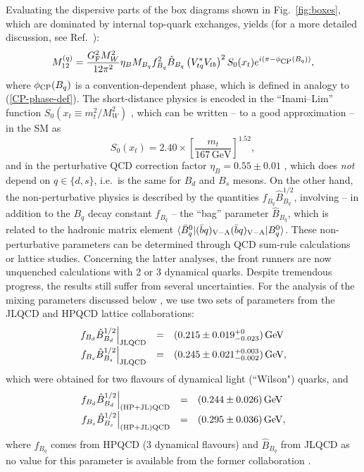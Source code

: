 \documentclass[11pt]{cernrep}
\begin{document}
Evaluating the dispersive parts of the box diagrams shown in
Fig.~\ref{fig:boxes}, which are dominated by internal top-quark 
exchanges, yields (for a more detailed discussion, see Ref.~\cite{BF-rev}):
\begin{equation}\label{M12-calc}
M_{12}^{(q)}=
\frac{G_{\rm F}^2 M_{W}^{2}}{12\pi^{2}}
\eta_B M_{B_q}f_{B_q}^{2}\hat B_{B_q}\left(V_{tq}^\ast V_{tb}\right)^2 
S_0(x_{t}) e^{i(\pi-\phi_{\mbox{{\scriptsize CP}}}(B_q))},
\end{equation}
where $\phi_{\mbox{{\scriptsize CP}}}(B_q)$ is a convention-dependent
phase, which is defined in analogy to (\ref{CP-phase-def}).
The short-distance physics is encoded in the ``Inami--Lim'' function 
$S_0(x_{t}\equiv m_t^2/M_W^2)$ \cite{IL}, which can be written -- to a good 
approximation -- in the SM  as \cite{Buras-Schladming}
\begin{equation}
S_0(x_t)=2.40\times\left[\frac{m_t}{167\,\mbox{GeV}}\right]^{1.52},
\end{equation}
and in the perturbative QCD correction factor  $\eta_B=0.55\pm0.01$ \cite{eta-B},
which does {\it not} depend on $q\in\{d,s\}$, i.e.\ is the same for $B_d$ and $B_s$ 
mesons. On the other hand, the non-perturbative physics is described by the 
quantities $f_{B_q}\hat B_{B_q}^{1/2}$, involving -- in addition to the $B_q$ decay 
constant $f_{B_q}$ -- the ``bag'' parameter $\hat B_{B_q}$, which is related to the hadronic matrix element $\langle \bar B^0_q|(\bar bq)_{{\rm V}-{\rm A}}
(\bar bq)_{{\rm V}-{\rm A}}|B^0_q\rangle$. These non-perturbative parameters
can be determined through QCD sum-rule calculations \cite{SR-calc}
or lattice studies. Concerning the latter analyses, the front runners are 
now unquenched calculations with 2 or 3 dynamical quarks. 
Despite tremendous progress, the results still suffer from several uncertainties. For the
analysis of the mixing parameters discussed below \cite{BF-DMs}, we use 
two sets of parameters from the JLQCD \cite{JLQCD} and 
HPQCD \cite{HPQCD} lattice collaborations:
\begin{equation}\label{JLQCD}
\begin{array}{rcl}
\left.f_{B_d}\hat{B}_{B_d}^{1/2}\right|_{\rm JLQCD} &=& (0.215\pm
0.019^{+0}_{-0.023})\,{\rm GeV}\\
\left.f_{B_s}\hat{B}_{B_s}^{1/2}\right|_{\rm JLQCD} &=& (0.245\pm
0.021^{+0.003}_{-0.002})\,{\rm GeV},
\end{array}
\end{equation}
which were obtained for two flavours of dynamical light (``Wilson") quarks, and
\begin{equation}\label{HPQCD}
\begin{array}{rcl}
\left.f_{B_d}\hat{B}_{B_d}^{1/2}\right|_{\rm (HP+JL)QCD}& =& (0.244\pm
0.026)\,{\rm GeV}\\
\left.f_{B_s}\hat{B}_{B_s}^{1/2}\right|_{\rm (HP+JL)QCD} &=&
(0.295\pm0.036)\,{\rm GeV},
\end{array}
\end{equation}
where $f_{B_q}$ comes from HPQCD (3 dynamical
flavours) and $\hat B_{B_q}$ from JLQCD as no value for this parameter
is available from the former collaboration \cite{Okamoto}. 
\end{document}
